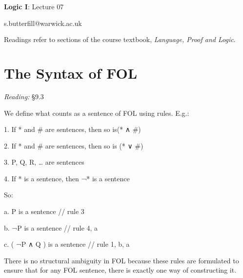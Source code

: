 \documentclass[12pt]{extarticle}
\date{}
\makeatletter
\def \ititle {Origins of Mind}
\def \isubtitle {Lecture 08}
\def \iemail{s.butterfill@warwick.ac.uk}
\makeatother
\begin{document}

\begin{multicols*}{3}

\setlength\footnotesep{1em}









\def \ititle {Logic I}
 
\def \isubtitle {Lecture 07}
 
\begin{center}
 
{\Large
 
\textbf{\ititle}: \isubtitle
 
}
 
 
 
\iemail %
 
\end{center}
 
Readings refer to sections of the course textbook, \emph{Language, Proof and Logic}.
 
 
 
\section{The Syntax of FOL}
 
\emph{Reading:} §9.3
 
We define what counts as a sentence of FOL using rules. E.g.:
 
1. If * and \# are sentences, then so is(* ∧ \#)
 
2. If * and \# are sentences, then so is (* ∨ \#)
 
3. P, Q, R, … are sentences
 
4. If * is a sentence, then ¬* is a sentence
 
So:
 
a. P is a sentence // rule 3
 
b. ¬P is a sentence // rule 4, a
 
c. ( ¬P ∧ Q ) is a sentence // rule 1, b, a
 
There is no structural ambiguity in FOL because these rules are formulated to ensure that for any FOL sentence, there is exactly one way of constructing it.
 

\end{multicols*}
\end{document}
